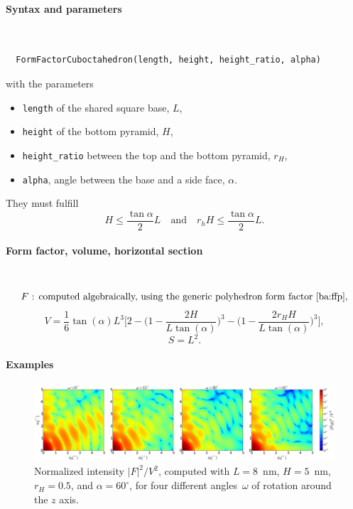 \FloatBarrier

\paragraph{Syntax and parameters}\strut\\[-2ex plus .2ex minus .2ex]
\begin{lstlisting}
  FormFactorCuboctahedron(length, height, height_ratio, alpha)
\end{lstlisting}
with the parameters
\begin{itemize}
\item \texttt{length} of the shared square base, $L$,
\item \texttt{height} of the bottom pyramid, $H$,
\item \texttt{height\_ratio} between the top and the bottom pyramid, $r_H$,
\item \texttt{alpha}, angle between the base and a side face, $\alpha$.
\end{itemize}
They must fulfill
\begin{displaymath}
  H \le \frac{\tan\alpha}{2} L
  \quad\text{and}\quad
  r_h H \le \frac{\tan\alpha}{2} L.
\end{displaymath}

\paragraph{Form factor, volume, horizontal section}\strut\\
\begin{equation*}
  F \text{~: computed algebraically,
          using the generic polyhedron form factor~\cite{ba:ffp},}
\end{equation*}
\begin{equation*}
  V= \dfrac{1}{6} \tan(\alpha)L^3 \Big[ 2
         - \Big(1 - \dfrac{2H }{L\tan(\alpha)} \Big)^3
           - \Big(1 - \dfrac{2 r_H
             H}{L\tan(\alpha) }\Big)^3\Big],
\end{equation*}
\begin{equation*}
  S =L^2.
\end{equation*}

\paragraph{Examples}\strut

\begin{figure}[H]
\begin{center}
\includegraphics[width=\textwidth]{fig/ff2/ff_Cuboctahedron.pdf}
\end{center}
\caption{Normalized intensity $|F|^2/V^2$,
computed with $L=8$~nm, $H=5$~nm, $r_H=0.5$, and $\alpha=60^\circ$,
for four different angles~$\omega$ of rotation around the $z$ axis.}
\end{figure}

